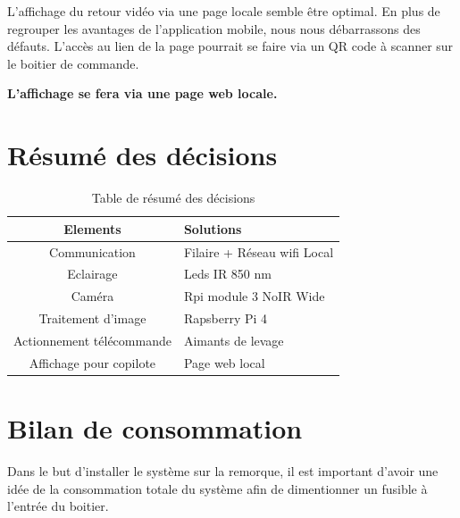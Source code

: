 L'affichage du retour vidéo via une page locale semble être optimal. En plus de regrouper les avantages de l'application mobile, nous nous débarrassons des défauts.
L'accès au lien de la page pourrait se faire via un QR code à scanner sur le boitier de commande.

\textbf{L'affichage se fera via une page web locale.}

\section{Résumé des décisions}
\begin{table}[H]
    \begin{center}
        \caption{Table de résumé des décisions}
        \begin{tabular}{|c|l|}
            Elements                  & Solutions                         \\ \hline
            Communication             & Filaire + Réseau \Gls{wifi} Local \\
            Eclairage                 & Leds IR 850 \si{\nano\metre}      \\
            Caméra                    & Rpi module 3 NoIR Wide            \\
            Traitement d'image        & Rapsberry Pi 4                    \\
            Actionnement télécommande & Aimants de levage                 \\
            Affichage pour copilote   & Page web local                    \\
        \end{tabular}
    \end{center}
\end{table}
\newpage
\section{Bilan de consommation}
Dans le but d'installer le système sur la remorque, il est important d'avoir une idée de la consommation totale du système afin de dimentionner
un fusible à l'entrée du boitier.


